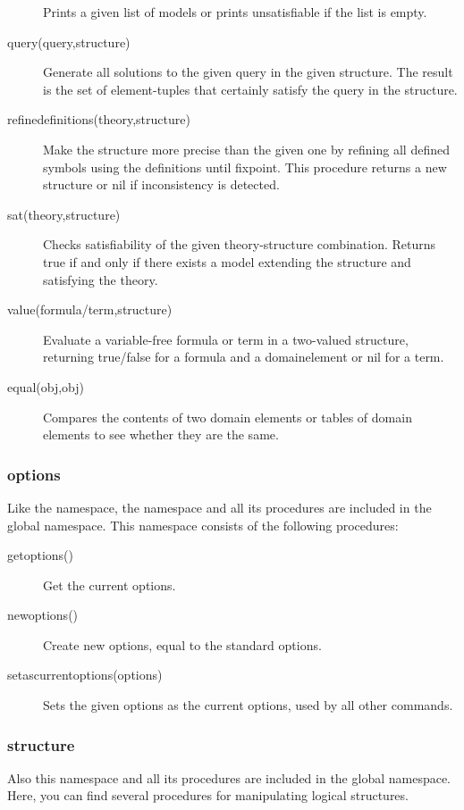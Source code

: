 \begin{description}
		Prints a given list of models or prints unsatisfiable if the list is empty.
	\item[query(query,structure)]
 		Generate all solutions to the given query in the given structure. The result is the set of element-tuples that certainly satisfy the query in the structure.
	\item[refinedefinitions(theory,structure)]
		Make the structure more precise than the given one by refining all defined symbols using the definitions until fixpoint. This procedure returns a new structure or nil if inconsistency is detected.
	\item[sat(theory,structure)]
		Checks satisfiability of the given theory-structure combination. Returns true if and only if there exists a model extending the structure and satisfying the theory.
	\item[value(formula/term,structure)]
		Evaluate a variable-free formula or term in a two-valued structure, returning true/false for a formula and a domainelement or nil for a term.
	\item[equal(obj,obj)]
		Compares the contents of two domain elements or tables of domain elements to see whether they are the same.		
\end{description}

\subsubsection{options}
Like the  namespace, the  namespace and all its procedures are included in the global namespace. This namespace consists of the following procedures:

\begin{description}
	\item[getoptions()]
 		Get the current options.
	\item[newoptions()]
 		Create new options, equal to the standard options.
	\item[setascurrentoptions(options)]
 		Sets the given options as the current options, used by all other commands.
\end{description}

\subsubsection{structure}
Also this  namespace and all its procedures are included in the global namespace. Here, you can find several procedures for manipulating logical structures.

